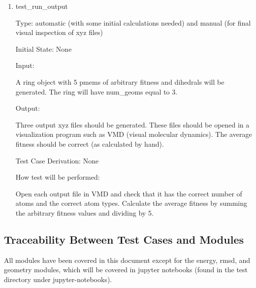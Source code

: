 \documentclass[12pt, titlepage]{article}
\begin{document}

\begin{enumerate}
	
\item{test\_run\_output\\}

Type: automatic (with some initial calculations needed) and manual (for final 
visual inspection of xyz files)

Initial State: None

Input: 

A ring object with 5 pmems of arbitrary fitness and dihedrals will be 
generated. The ring will have num\_geoms equal to 3.

Output:

Three output xyz files should be generated. These files should be opened in a 
visualization program such as VMD (visual molecular dynamics). The average 
fitness should be correct (as calculated by hand).

Test Case Derivation: None

How test will be performed: 

Open each output file in VMD and check that it has the correct number of atoms 
and the correct atom types. Calculate the average fitness by summing the 
arbitrary fitness values and dividing by 5.
	
\end{enumerate}

\subsection{Traceability Between Test Cases and Modules}

All modules have been covered in this document except for the energy, rmsd, and 
geometry modules, which will be covered in jupyter notebooks (found in the test 
directory under jupyter-notebooks).



\end{document}
